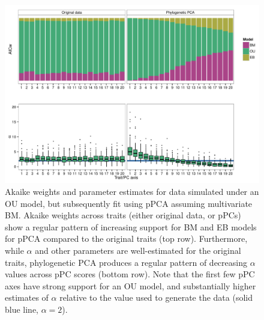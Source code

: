 \documentclass[a4paper,12pt]{article}
\begin{document}
\begin{figure}[p]
\centering
\includegraphics[scale=0.5]{./fig/model-support-alpha.pdf}
\caption{Akaike weights and parameter estimates for data simulated under an OU model, but subsequently fit using pPCA assuming multivariate BM. Akaike weights across traits (either original data, or pPCs) show a regular pattern of increasing support for BM and EB models for pPCA compared to the original traits (top row). Furthermore, while $\alpha$ and other parameters are well-estimated for the original traits, phylogenetic PCA produces a regular pattern of decreasing $\alpha$ values across pPC scores (bottom row). Note that the first few pPC axes have strong support for an OU model, and substantially higher estimates of $\alpha$ relative to the value used to generate the data (solid blue line, $\alpha = 2$). }
\label{oufit}
\end{figure}
\end{document}
